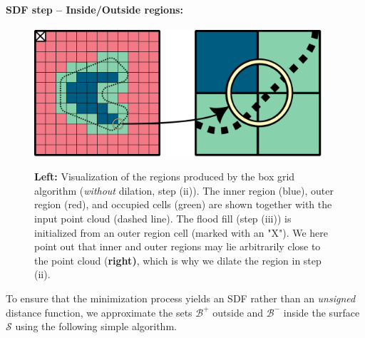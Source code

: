 \documentclass[12pt,openany]{book}
\theoremstyle{plainnormal}
\theoremstyle{remark}
\begin{document}
\paragraph{SDF step -- Inside/Outside regions:}
\begin{figure}[!b]
    \centering
    \includegraphics[width = 0.95\textwidth]{Figures/InnerOuter.pdf}\label{InnerOuter}
    \caption{\textbf{Left:} Visualization of the regions produced by the box grid algorithm (\emph{without} dilation, step (ii)). The inner region (blue), outer region (red), and occupied cells (green) are shown together with the input point cloud (dashed line). The flood fill (step (iii)) is initialized from an outer region cell (marked with an "X"). We here point out that inner and outer regions may lie arbitrarily close to the point cloud (\textbf{right)}, which is why we dilate the region in step (ii).
}
\end{figure}
To ensure that the minimization process yields an SDF rather than an \emph{unsigned} distance function, we approximate the sets $\mathcal{B}^+$ outside and $\mathcal{B}^-$ inside the surface $\mathcal{S}$ using the following simple algorithm.
\end{document}
